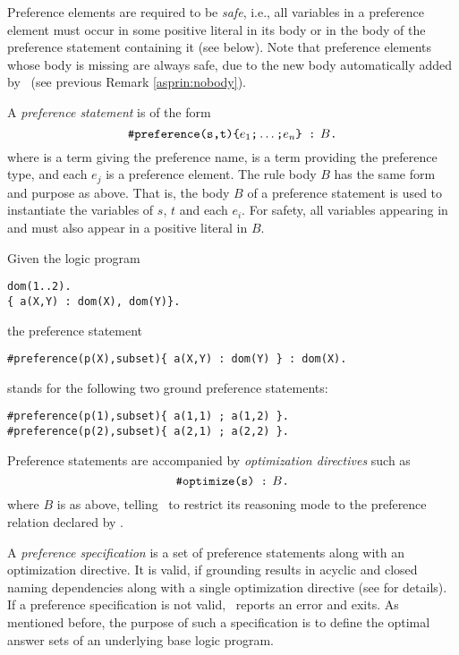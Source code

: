 \begin{note}
Preference elements are required to be \emph{safe}, 
i.e., all variables in a preference element must occur in some positive literal 
in its body or in the body of the preference statement containing it (see below).  
%
Note that preference elements whose body is missing are always safe, 
due to the new body automatically added by \asprin\ 
(see previous Remark \ref{asprin:nobody}).
\end{note} 

A \emph{preference statement} is of the form %
\[\texttt{\#preference(s,t)\{}e_1\texttt{;}\dots\texttt{;}e_n\texttt{\} : }\!\!\!\!B\texttt{.}\]
%
where  is a term giving the preference name, 
 is a  term providing the preference type, 
and each $e_j$ is a preference element.
The rule body $B$ has the same form and purpose as above.
%
That is, the body $B$ of a preference statement is used to instantiate the variables of $s$, $t$ and each $e_i$.
For safety, all variables appearing in \code{s} and \code{t} must also appear in a positive literal in $B$.

\begin{example}
\label{asprin:example2}
Given the logic program 
\begin{lstlisting}[numbers=none]
dom(1..2).
{ a(X,Y) : dom(X), dom(Y)}.
\end{lstlisting}
the preference statement 
\begin{lstlisting}[numbers=none]
#preference(p(X),subset){ a(X,Y) : dom(Y) } : dom(X).
\end{lstlisting}
stands for the following two ground preference statements:
\begin{lstlisting}[numbers=none]
#preference(p(1),subset){ a(1,1) ; a(1,2) }.
#preference(p(2),subset){ a(2,1) ; a(2,2) }.
\end{lstlisting}
\end{example}

Preference statements are accompanied by 
\emph{optimization directives} such as
\[\texttt{\#optimize(s) : }\!\!\!\!B\texttt{.}\]
where $B$ is as above, 
telling \asprin\ to restrict its reasoning mode to the preference relation declared by .
% 

A \emph{preference specification} is a set of preference statements along with an optimization directive.
It is valid, if grounding results in acyclic and closed naming dependencies
along with a single optimization directive
(see \cite{brderosc15a} for details).
If a preference specification is not valid, \asprin\ reports an error and exits.
%
As mentioned before,
the purpose of such a specification is to define the optimal answer sets of an underlying base logic program.

